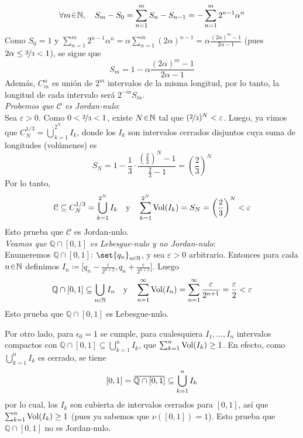 \begin{sol}
\[
\forall m\en\mathbb{N},\quad
S_{m} - S_0 = \sum^m_{n=1} S_{n} - S_{n-1} = - \sum^m_{n=1}2^{n-1}\alpha^{n}
\]
Como $S_0 = 1$ y $\sum^m_{n=1}2^{n-1}\alpha^{n} = \alpha\sum^m_{n=1}(2\alpha)^{n-1} = \alpha\frac{(2\alpha)^m - 1}{2\alpha-1}$ (pues $2\alpha \le \nicefrac{2}{3} < 1$), se sigue que 
\[
S_m = 1 - \alpha\frac{(2\alpha)^m - 1}{2\alpha-1}
\]
Además, $C^\alpha_m$ es unión de $2^m$ intervalos de la misma longitud, por lo tanto, la longitud de cada intervalo será $2^{-m}S_m$.\vspace{1em}\\
\emph{Probemos que $\mathcal{C}$ es Jordan-nulo}:\\
Sea $\varepsilon>0$. Como $0 < \nicefrac{2}{3} < 1$, existe $N\en\mathbb{N}$ tal que $(\nicefrac{2}{3})^N < \varepsilon$. Luego, ya vimos que $C^{1/3}_N = \dot\bigcup^{2^N}_{k=1} I_k$, donde los $I_k$ son intervalos cerrados disjuntos cuya suma de longitudes (volúmenes) es 
\[
S_N = 1 - \frac{1}{3}\cdot\frac{(\frac{2}{3})^N - 1}{\frac{2}{3}-1} = \left(\frac{2}{3}\right)^N
\]
Por lo tanto,
\[
\mathcal{C} \subseteq C^{1/3}_N = \bigcup^{2^N}_{k=1} I_k
\quad\text{y}\quad
\sum^{2^N}_{k=1} \operatorname{Vol}(I_k) = S_N = \left(\frac23\right)^N < \varepsilon
\]
Esto prueba que $\mathcal{C}$ es Jordan-nulo.\vspace{1em}\\
\emph{Veamos que $\mathbb{Q}\cap[0,1]$ es Lebesgue-nulo y no Jordan-nulo}:\\
Enumeremos $\mathbb{Q} \cap [0,1]$: $\set{q_n}_{n\en\mathbb{N}}$, y sea $\varepsilon > 0$ arbitrario. Entonces para cada $n\en\mathbb{N}$ definimos $I_n \coloneq \bigl[q_n-\frac{\varepsilon}{2^{n+2}},q_n+\frac{\varepsilon}{2^{n+2}}\bigr]$. Luego
\[
\mathbb{Q} \cap [0,1] \subseteq \bigcup_{n\en\mathbb{N}} I_n
\quad\text{y}\quad
\sum^\infty_{n=1}\vol(I_n) = \sum^\infty_{n=1}\frac{\varepsilon}{2^{n+1}} = \frac{\varepsilon}{2} < \varepsilon
\]
Esto prueba que $\mathbb{Q} \cap [0,1]$ es Lebesgue-nulo.\par
Por otro lado, para $\epsilon_0 = 1$ se cumple, para cualesquiera $I_1,\dots,I_n$ intervalos compactos con $\mathbb{Q} \cap [0,1] \subseteq \bigcup^n_{k=1} I_k$, que $\sum^n_{k=1} \operatorname{Vol}(I_k) \ge 1$. En efecto, como $\bigcup^n_{k=1} I_k$ es cerrado, se tiene 
\[
[0,1] = \ubar{\mathbb{Q} \cap [0,1]} \subseteq \bigcup^n_{k=1} I_k
\]
por lo cual, los $I_k$ son cubierta de intervalos cerrados para $[0,1]$, así que $\sum^n_{k=1} \operatorname{Vol}(I_k) \ge 1$ (pues ya sabemos que $\nu([0,1]) = 1$). Esto prueba que $\mathbb{Q} \cap [0,1]$ no es Jordan-nulo.\vspace{1em}\\

\end{sol}
